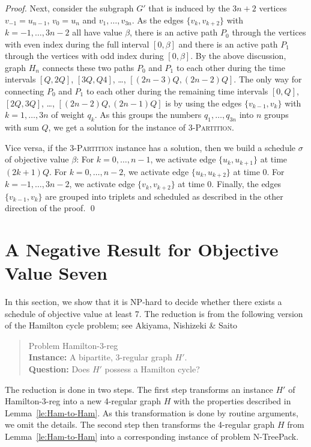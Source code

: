 \documentclass[runningheads]{llncs}
\newcommand{\set}[1]{\{ #1 \}}
\newcommand{\xxxNTP}{{\sc N-TreePack}}
\newcommand{\xxxHAM}{{\sc Hamilton-3-reg}}
\begin{document}
\begin{proof}
Next, consider the subgraph $G'$ that is induced by the $3n+2$ vertices $v_{-1}=u_{n-1}$, $v_0=u_n$ and 
$v_1,\ldots,v_{3n}$.
As the edges $\{v_k, v_{k+2}\}$ with $k=-1,\ldots,3n-2$ all have value $\beta$, there is an active path $P_0$ 
through the vertices with even index during the full interval $[0,\beta]$ and there is an active 
path $P_1$ through the vertices with odd index during $[0, \beta]$.
By the above discussion, graph $H_n$ connects these two paths $P_0$ and $P_1$ to each other during the
time intervals $[Q,2Q]$, $[3Q,Q4]$, \dots, $[(2n-3)Q,(2n-2)Q]$.
The only way for connecting $P_0$ and $P_1$ to each other during the remaining time intervals 
$[0,Q]$, $[2Q,3Q]$, \dots, $[(2n-2)Q,(2n-1)Q]$ is by using the edges $\{v_{k-1},v_k\}$ with $k=1,\ldots,3n$ of 
weight $q_k$.
As this groups the numbers $q_1,\ldots,q_{3n}$ into $n$ groups with sum $Q$, we get a solution
for the instance of \textsc{3-Partition}.

Vice versa, if the \textsc{3-Partition} instance has a solution, then we  build a schedule $\sigma$
of objective value $\beta$: For $k=0,\ldots,n-1$, we activate edge $\set{u_k, u_{k+1}}$ at time $(2k+1)Q$. For $k=0,\ldots,n-2$, we activate edge $\set{u_k, u_{k+2}}$ at time $0$. For $k=-1,\ldots,3n-2$, we activate edge $\set{v_k, v_{k+2}}$ at time $0$. Finally, the edges $\set{v_{k-1},v_k}$ are grouped into triplets and scheduled as described in the other direction of the proof.
\qed
\end{proof}


\section{A Negative Result for Objective Value Seven}
\label{sec:value-seven}
In this section, we show that it is NP-hard to decide whether there exists a schedule of objective value at least 7. 
The reduction is from the following version of the Hamilton cycle problem; 
see Akiyama, Nishizeki \& Saito \cite{hamilton3regularBip}
\begin{quote}
Problem {\xxxHAM}
\\
\textbf{Instance:} A bipartite, 3-regular graph $H'$.  
\\
\textbf{Question:} Does $H'$ possess a Hamilton cycle? 
\end{quote}
The reduction is done in two steps.
The first step transforms an instance $H'$ of {\xxxHAM} into a new 4-regular graph $H$ 
with the properties described in Lemma~\ref{le:Ham-to-Ham}.
As this transformation is done by routine arguments, we omit the details.
The second step then transforms the 4-regular graph $H$ from Lemma~\ref{le:Ham-to-Ham}
into a corresponding instance of problem {\xxxNTP}.
\end{document}
